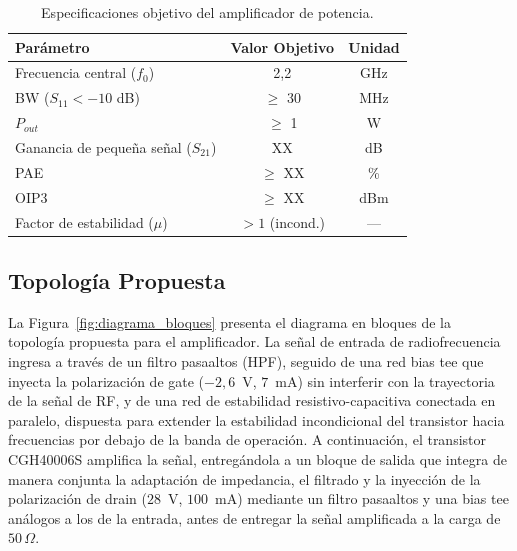 \begin{table}[H]
    \centering
    \caption{Especificaciones objetivo del amplificador de potencia.}
    \label{tab:objetivos_diseno}
    \begin{tabular}{lcc}
        \hline\hline
        \textbf{Parámetro}                   & \textbf{Valor Objetivo} & \textbf{Unidad} \\
        \hline
        Frecuencia central ($f_0$)           & 2,2                     & GHz             \\
        BW ($S_{11} < -10$ dB)               & $\ge$ 30                & MHz             \\
        $P_{out}$                            & $\ge$ 1                 & W               \\
        Ganancia de pequeña señal ($S_{21}$) & XX                      & dB              \\
        PAE                                  & $\ge$ XX                & \%              \\
        OIP3                                 & $\ge$ XX                & dBm             \\
        Factor de estabilidad ($\mu$)        & $> 1$ (incond.)         & ---             \\
        \hline\hline
    \end{tabular}
\end{table}

\subsection{Topología Propuesta}
La Figura~\ref{fig:diagrama_bloques} presenta el diagrama en bloques de la topología propuesta para el amplificador. La señal de entrada de radiofrecuencia ingresa a través de un filtro pasaaltos (HPF), seguido de una red bias tee que inyecta la polarización de gate ($-2{,}6$~V, $7$~mA) sin interferir con la trayectoria de la señal de RF, y de una red de estabilidad resistivo-capacitiva conectada en paralelo, dispuesta para extender la estabilidad incondicional del transistor hacia frecuencias por debajo de la banda de operación. A continuación, el transistor CGH40006S amplifica la señal, entregándola a un bloque de salida que integra de manera conjunta la adaptación de impedancia, el filtrado y la inyección de la polarización de drain ($28$~V, $100$~mA) mediante un filtro pasaaltos y una bias tee análogos a los de la entrada, antes de entregar la señal amplificada a la carga de $50\,\Omega$.

